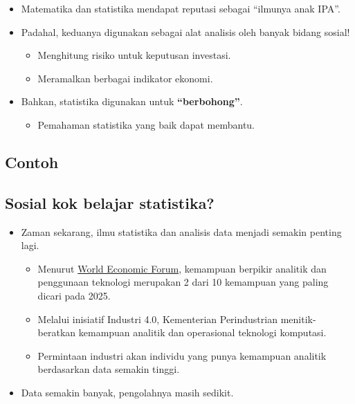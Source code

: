 \documentclass[
  letterpaper,
  DIV=11,
  numbers=noendperiod]{scrartcl}
\providecommand{\tightlist}{%
  \setlength{\itemsep}{0pt}\setlength{\parskip}{0pt}}\usepackage{longtable,booktabs,array}
\begin{document}
\begin{itemize}
\item
  Matematika dan statistika mendapat reputasi sebagai ``ilmunya anak
  IPA''.
\item
  Padahal, keduanya digunakan sebagai alat analisis oleh banyak bidang
  sosial!

  \begin{itemize}
  \item
    Menghitung risiko untuk keputusan investasi.
  \item
    Meramalkan berbagai indikator ekonomi.
  \end{itemize}
\item
  Bahkan, statistika digunakan untuk \textbf{``berbohong''}.

  \begin{itemize}
  \tightlist
  \item
    Pemahaman statistika yang baik dapat membantu.
  \end{itemize}
\end{itemize}

\hypertarget{contoh}{%
\subsection{Contoh}\label{contoh}}

\hypertarget{sosial-kok-belajar-statistika-1}{%
\subsection{Sosial kok belajar
statistika?}\label{sosial-kok-belajar-statistika-1}}

\begin{itemize}
\item
  Zaman sekarang, ilmu statistika dan analisis data menjadi semakin
  penting lagi.

  \begin{itemize}
  \item
    Menurut
    \href{https://www.weforum.org/agenda/2020/10/top-10-work-skills-of-tomorrow-how-long-it-takes-to-learn-them/}{World
    Economic Forum}, kemampuan berpikir analitik dan penggunaan
    teknologi merupakan 2 dari 10 kemampuan yang paling dicari pada
    2025.
  \item
    Melalui inisiatif Industri 4.0, Kementerian Perindustrian
    menitik-beratkan kemampuan analitik dan operasional teknologi
    komputasi.
  \item
    Permintaan industri akan individu yang punya kemampuan analitik
    berdasarkan data semakin tinggi.
  \end{itemize}
\item
  Data semakin banyak, pengolahnya masih sedikit.
\end{itemize}
\end{document}
